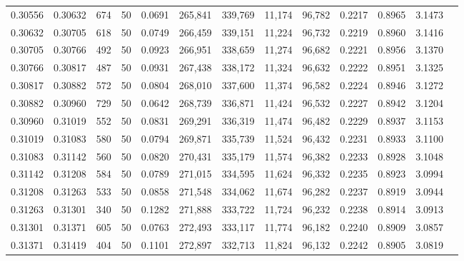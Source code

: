 \begin{tabular}{rrrrrrrrrrrrr}
0.30556 & 0.30632 &   674 &  50 &                                     0.0691 & 265,841 & 339,769 &  11,174 &  96,782 & 0.2217 & 0.8965 & 3.1473 \\
0.30632 & 0.30705 &   618 &  50 &                                     0.0749 & 266,459 & 339,151 &  11,224 &  96,732 & 0.2219 & 0.8960 & 3.1416 \\
0.30705 & 0.30766 &   492 &  50 &                                     0.0923 & 266,951 & 338,659 &  11,274 &  96,682 & 0.2221 & 0.8956 & 3.1370 \\
0.30766 & 0.30817 &   487 &  50 &                                     0.0931 & 267,438 & 338,172 &  11,324 &  96,632 & 0.2222 & 0.8951 & 3.1325 \\
0.30817 & 0.30882 &   572 &  50 &                                     0.0804 & 268,010 & 337,600 &  11,374 &  96,582 & 0.2224 & 0.8946 & 3.1272 \\
0.30882 & 0.30960 &   729 &  50 &                                     0.0642 & 268,739 & 336,871 &  11,424 &  96,532 & 0.2227 & 0.8942 & 3.1204 \\
0.30960 & 0.31019 &   552 &  50 &                                     0.0831 & 269,291 & 336,319 &  11,474 &  96,482 & 0.2229 & 0.8937 & 3.1153 \\
0.31019 & 0.31083 &   580 &  50 &                                     0.0794 & 269,871 & 335,739 &  11,524 &  96,432 & 0.2231 & 0.8933 & 3.1100 \\
0.31083 & 0.31142 &   560 &  50 &                                     0.0820 & 270,431 & 335,179 &  11,574 &  96,382 & 0.2233 & 0.8928 & 3.1048 \\
0.31142 & 0.31208 &   584 &  50 &                                     0.0789 & 271,015 & 334,595 &  11,624 &  96,332 & 0.2235 & 0.8923 & 3.0994 \\
0.31208 & 0.31263 &   533 &  50 &                                     0.0858 & 271,548 & 334,062 &  11,674 &  96,282 & 0.2237 & 0.8919 & 3.0944 \\
0.31263 & 0.31301 &   340 &  50 &                                     0.1282 & 271,888 & 333,722 &  11,724 &  96,232 & 0.2238 & 0.8914 & 3.0913 \\
0.31301 & 0.31371 &   605 &  50 &                                     0.0763 & 272,493 & 333,117 &  11,774 &  96,182 & 0.2240 & 0.8909 & 3.0857 \\
0.31371 & 0.31419 &   404 &  50 &                                     0.1101 & 272,897 & 332,713 &  11,824 &  96,132 & 0.2242 & 0.8905 & 3.0819 \\

\end{tabular}
